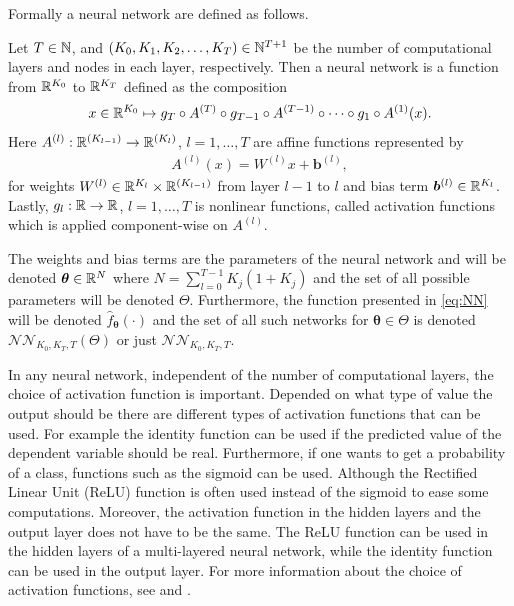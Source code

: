 Formally a neural network are defined as follows.
\begin{defn}\label{def:NN}
    Let $T \in \mathbb{N}$, and $(K_0, K_1, K_2, \ldots, K_T) \in\mathbb{N}^{T+1}$ be the number of computational layers and nodes in each layer, respectively. Then a neural network is a function from $\mathbb{R}^{K_0}$ to $\mathbb{R}^{K_T}$ defined as the composition
    \begin{align}\label{eq:NN}
        x \in \mathbb{R}^{K_0} \mapsto g_T \circ A^{(T)} \circ g_{T-1} \circ A^{(T-1)} \circ \cdots \circ g_1 \circ A^{(1)}(x).
    \end{align}
    Here $A^{(l)}: \mathbb{R}^{(K_{l-1})} \to \mathbb{R}^{(K_l)}$, $l = 1, \ldots, T$ are affine functions represented by 
    \begin{align*}
        A^{(l)}(x) = W^{(l)} x + \bm{b}^{(l)},
    \end{align*}
    for weights $W^{(l)} \in \mathbb{R}^{K_l} \times \mathbb{R}^{(K_{l-1})}$ from layer $l-1$ to $l$ and bias term $\bm{b}^{(l)} \in \mathbb{R}^{K_l}$. Lastly, $g_l: \mathbb{R} \to \mathbb{R}$, $l = 1, \ldots, T$ is nonlinear functions, called activation functions which is applied component-wise on $A^{(l)}$.
\end{defn} 

The weights and bias terms are the parameters of the neural network and will be denoted $\bm{\theta} \in \mathbb{R}^{N}$ where $N = \sum_{l = 0}^{T-1} K_j(1+K_j)$ and the set of all possible parameters will be denoted $\Theta$. Furthermore, the function presented in \eqref{eq:NN} will be denoted $\hat{f}_{\bm{\theta}}(\cdot)$ and the set of all such networks for $\bm{\theta} \in \Theta$ is denoted $\mathcal{NN}_{K_0, K_T, T}(\Theta)$ or just $\mathcal{NN}_{K_0, K_T, T}$.

In any neural network, independent of the number of computational layers, the choice of activation function is important. Depended on what type of value the output should be there are different types of activation functions that can be used. For example the identity function can be used if the predicted value of the dependent variable should be real. Furthermore, if one wants to get a probability of a class, functions such as the sigmoid can be used. Although the Rectified Linear Unit (ReLU) function is often used instead of the sigmoid to ease some computations. Moreover, the activation function in the hidden layers and the output layer does not have to be the same. The ReLU function can be used in the hidden layers of a multi-layered neural network, while the identity function can be used in the output layer. For more information about the choice of activation functions, see \citep[p. 2-6]{NNDesign} and \citep[p. 11-13]{NNDL}.


